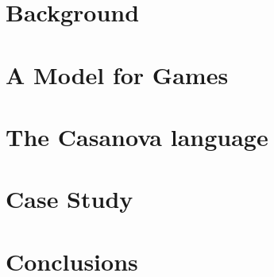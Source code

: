 \documentclass{llncs}
\begin{document}
\section{Background}
\label{sec:background}
 

\section{A Model for Games}
\label{sec:model}
 

\section{The Casanova language}
\label{sec:casanova}


\section{Case Study}
\label{sec:case_study}


\section{Conclusions}
\label{sec:conclusions}
 


 

\nocite{}
\end{document}
